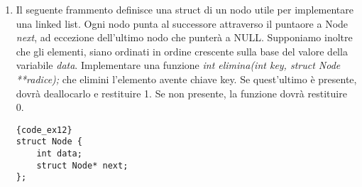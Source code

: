 \begin{enumerate}
\begin{minipage}{.45\textwidth}
\begin{lstlisting}{code_ex12}
#include <stdio.h>
int main(void) {
    int a = 5, b = 2;
    float division =  a / b;
    printf("%.3f", division);
    return 0;
}
\end{lstlisting}
\end{minipage}\hfill
\begin{minipage}[t]{.45\textwidth}
\end{minipage}


\vspace{1.4cm}
\item {} Il seguente frammento definisce una struct di un nodo utile per implementare una linked list. Ogni nodo punta al successore attraverso il puntaore a Node \emph{next}, ad eccezione dell'ultimo nodo che punterà a NULL. Supponiamo inoltre che gli elementi, siano ordinati in ordine crescente sulla base del valore della variabile \emph{data}. 
Implementare una funzione \emph{int elimina(int key, struct Node **radice);} che elimini l'elemento avente chiave key. Se quest'ultimo è presente, dovrà deallocarlo e restituire 1. Se non presente, la funzione dovrà restituire 0.

\begin{minipage}{.45\textwidth}
\begin{lstlisting}{code_ex12}
struct Node { 
    int data; 
    struct Node* next; 
}; 
\end{lstlisting}
\end{minipage}\hfill
\begin{minipage}[t]{.45\textwidth}
\end{minipage}



\end{enumerate}

